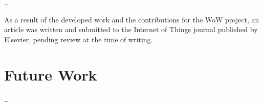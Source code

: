 
\dots

As a result of the developed work and the contributions for the \acs{WoW} project, an article \cite{Fama2021} was written and submitted to the Internet of Things journal published by Elsevier, pending review at the time of writing. 


\section{Future Work}
\dots
